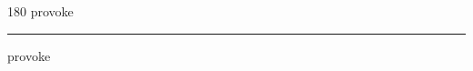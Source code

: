 
\begin{frame}
\begin{center}
\begin{turn}{180}
{\fontsize{2.5cm}{1em}\selectfont provoke}
\end{turn}
\vspace{1em}\par  
\hrule
\vspace{1em}\par  
{\fontsize{2.5cm}{1em}\selectfont provoke}
\end{center}
\end{frame}
